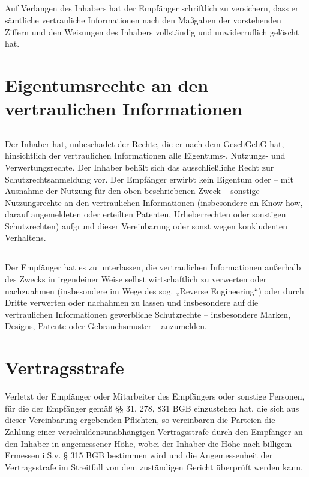 \documentclass[10pt]{article}
\begin{document}
\subsection{} Auf Verlangen des Inhabers hat der Empfänger schriftlich zu versichern, dass er sämtliche vertrauliche Informationen nach den Maßgaben der vorstehenden Ziffern und den Weisungen des Inhabers vollständig und unwiderruflich gelöscht hat. 


\section{Eigentumsrechte an den vertraulichen Informationen}

\subsection{} Der Inhaber hat, unbeschadet der Rechte, die er nach dem GeschGehG hat, hinsichtlich der vertraulichen Informationen alle Eigentums-, Nutzungs- und Verwertungsrechte. Der Inhaber behält sich das ausschließliche Recht zur Schutzrechtsanmeldung vor. Der Empfänger erwirbt kein Eigentum oder – mit Ausnahme der Nutzung für den oben beschriebenen Zweck – sonstige Nutzungsrechte an den vertraulichen Informationen (insbesondere an Know-how, darauf angemeldeten oder erteilten Patenten, Urheberrechten oder sonstigen Schutzrechten) aufgrund dieser Vereinbarung oder sonst wegen konkludenten Verhaltens.

\subsection{} Der Empfänger hat es zu unterlassen, die vertraulichen Informationen außerhalb des Zwecks in irgendeiner Weise selbst wirtschaftlich zu verwerten oder nachzuahmen (insbesondere im Wege des sog. „Reverse Engineering“) oder durch Dritte verwerten oder nachahmen zu lassen und insbesondere auf die vertraulichen Informationen gewerbliche Schutzrechte – insbesondere Marken, Designs, Patente oder Gebrauchsmuster – anzumelden.


\section{Vertragsstrafe}

Verletzt der Empfänger oder Mitarbeiter des Empfängers oder sonstige Personen, für die der Empfänger gemäß §§ 31, 278, 831 BGB einzustehen hat, die sich aus dieser Vereinbarung ergebenden Pflichten, so vereinbaren die Parteien die Zahlung einer verschuldensunabhängigen Vertragsstrafe durch den Empfänger an den Inhaber in angemessener Höhe, wobei der Inhaber die Höhe nach billigem Ermessen i.S.v. § 315 BGB bestimmen wird und die Angemessenheit der Vertragsstrafe im Streitfall von dem zuständigen Gericht überprüft werden kann.
\end{document}
